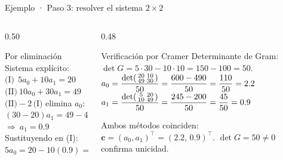 \documentclass[aspectratio=169,10pt]{beamer}
\begin{document}
\begin{frame}{Ejemplo · Paso 3: resolver el sistema $2\times2$}
\begin{columns}[T]
\begin{column}{0.50\textwidth}
\begin{cardgear}{Por eliminación}{\faCalculator}
{\footnotesize Sistema explícito:\\[0.4mm]
$\text{(I)}\ \ 5a_0+10a_1=20$\\[0.2mm]
$\text{(II)}\ 10a_0+30a_1=49$\\[1.2mm]
$\text{(II)}-2\,\text{(I)}$ elimina $a_0$:\\[0.3mm]
$(30-20)a_1=49-40\ \Rightarrow\ 10a_1=9$\\[0.3mm]
$\Rightarrow\ \boxed{a_1=0.9}$\\[1.0mm]
Sustituyendo en (I):\\[0.3mm]
$5a_0=20-10(0.9)=11\ \Rightarrow\ \boxed{a_0=2.2}$}
\end{cardgear}
\end{column}
\begin{column}{0.48\textwidth}
\begin{cardidea}{Verificación por Cramer}{\faCheckDouble}
{\footnotesize Determinante de Gram:\\[0.3mm]
$\det G=5\cdot30-10\cdot10=150-100=50$.\\[1.2mm]
$a_0=\dfrac{\det\begin{psmallmatrix}20&10\\ 49&30\end{psmallmatrix}}{50}=\dfrac{600-490}{50}=\dfrac{110}{50}=2.2$\\[1.4mm]
$a_1=\dfrac{\det\begin{psmallmatrix}5&20\\ 10&49\end{psmallmatrix}}{50}=\dfrac{245-200}{50}=\dfrac{45}{50}=0.9$}
\end{cardidea}
\vspace{1mm}
\begin{cardnota}[\faCheckCircle]
{\footnotesize Ambos métodos coinciden: $\mathbf c=(a_0,a_1)^{\!\top}=(2.2,\,0.9)^{\!\top}$. $\det G=50\neq0$ confirma unicidad.}
\end{cardnota}
\end{column}
\end{columns}
\end{frame}
\end{document}
